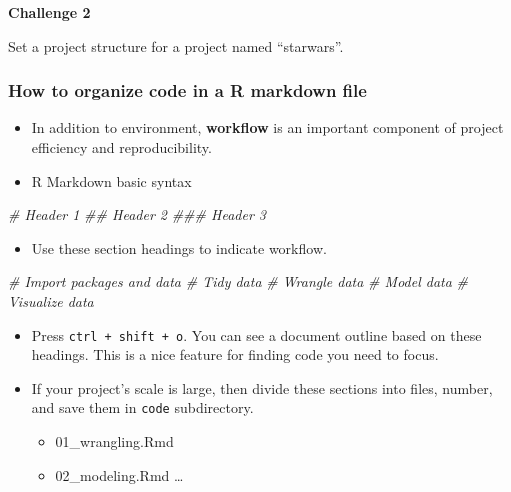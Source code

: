 \documentclass[
]{book}
\newenvironment{Shaded}{\begin{snugshade}}{\end{snugshade}}
\newcommand{\CommentTok}[1]{\textcolor[rgb]{0.56,0.35,0.01}{\textit{#1}}}
\providecommand{\tightlist}{%
  \setlength{\itemsep}{0pt}\setlength{\parskip}{0pt}}
\begin{document}
\textbf{Challenge 2}

Set a project structure for a project named ``starwars''.

\hypertarget{how-to-organize-code-in-a-r-markdown-file}{%
\subsubsection{How to organize code in a R markdown file}\label{how-to-organize-code-in-a-r-markdown-file}}

\begin{itemize}
\item
  In addition to environment, \textbf{workflow} is an important component of project efficiency and reproducibility.
\item
  R Markdown basic syntax
\end{itemize}

\begin{Shaded}
\begin{Highlighting}[]
\CommentTok{\# Header 1}
\CommentTok{\#\# Header 2}
\CommentTok{\#\#\# Header 3}
\end{Highlighting}
\end{Shaded}

\begin{itemize}
\tightlist
\item
  Use these section headings to indicate workflow.
\end{itemize}

\begin{Shaded}
\begin{Highlighting}[]
\CommentTok{\# Import packages and data}
\CommentTok{\# Tidy data}
\CommentTok{\# Wrangle data}
\CommentTok{\# Model data}
\CommentTok{\# Visualize data}
\end{Highlighting}
\end{Shaded}

\begin{itemize}
\item
  Press \texttt{ctrl\ +\ shift\ +\ o}. You can see a document outline based on these headings. This is a nice feature for finding code you need to focus.
\item
  If your project's scale is large, then divide these sections into files, number, and save them in \texttt{code} subdirectory.

  \begin{itemize}
  \tightlist
  \item
    01\_wrangling.Rmd
  \item
    02\_modeling.Rmd
    \ldots{}
  \end{itemize}
\end{itemize}
\end{document}
